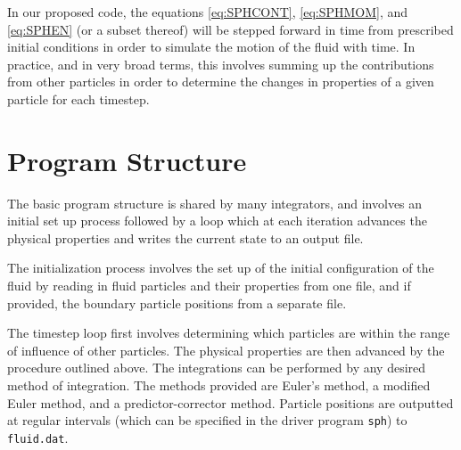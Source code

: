\documentclass[11pt]{article}
\begin{document}
In our proposed code, the equations \ref{eq:SPHCONT}, \ref{eq:SPHMOM}, and \ref{eq:SPHEN} (or a subset thereof) will be stepped forward in time from prescribed initial conditions in order to simulate the motion of the fluid with time. In practice, and in very broad terms, this involves summing up the contributions from other particles in order to determine the changes in properties of a given particle for each timestep. 
\\

%



\section{Program Structure}

The basic program structure is shared by many integrators, and involves an 
initial set up process followed by a loop which at each iteration advances the
physical properties and writes the current state to an output file.

The initialization process involves the set up of the initial configuration of the fluid
by reading in fluid particles and their properties from one file, and if
provided, the boundary particle positions from a separate file.

The timestep loop first involves determining which particles are within the
range of influence of other particles. The physical 
properties are then advanced by the procedure outlined above. The 
integrations can be performed by any desired method of integration. The methods 
provided are Euler's method, a modified Euler method, and a predictor-corrector method.
Particle positions are outputted at regular intervals (which can be specified in the driver program \texttt{sph}) to \texttt{fluid.dat}.
\end{document}
